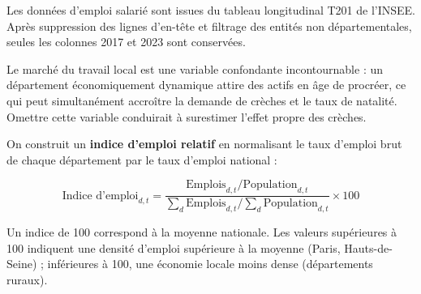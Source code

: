 \documentclass[
  letterpaper,
  DIV=11,
  numbers=noendperiod]{scrartcl}
\begin{document}
Les données d'emploi salarié sont issues du tableau longitudinal T201 de
l'INSEE. Après suppression des lignes d'en-tête et filtrage des entités
non départementales, seules les colonnes 2017 et 2023 sont conservées.

Le marché du travail local est une variable confondante incontournable :
un département économiquement dynamique attire des actifs en âge de
procréer, ce qui peut simultanément accroître la demande de crèches et
le taux de natalité. Omettre cette variable conduirait à surestimer
l'effet propre des crèches.

On construit un \textbf{indice d'emploi relatif} en normalisant le taux
d'emploi brut de chaque département par le taux d'emploi national :

\[\text{Indice d'emploi}_{d,t} = \frac{\text{Emplois}_{d,t} / \text{Population}_{d,t}}{\displaystyle\sum_d \text{Emplois}_{d,t} \big/ \sum_d \text{Population}_{d,t}} \times 100\]

Un indice de 100 correspond à la moyenne nationale. Les valeurs
supérieures à 100 indiquent une densité d'emploi supérieure à la moyenne
(Paris, Hauts-de-Seine) ; inférieures à 100, une économie locale moins
dense (départements ruraux).
\end{document}
